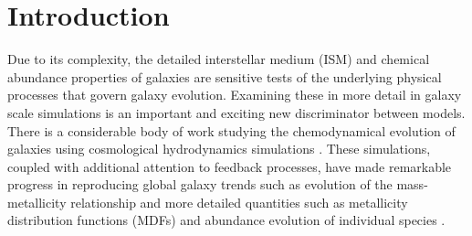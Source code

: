 \documentclass[twocolumn]{aastex61}
\begin{document}

\section{Introduction}
%
%
%

Due to its complexity, the detailed interstellar medium (ISM) and chemical abundance properties of galaxies
are sensitive tests of the underlying physical processes that govern galaxy evolution. Examining these in more detail in galaxy scale simulations is an important and exciting new discriminator between models. There is a considerable body of work studying the chemodynamical evolution of galaxies using cosmological hydrodynamics simulations \citep[e.g.][]{Lia2002,KawataGibson2003,Kobayashi2004,Tornatore2004,Romeo2005,OppenheimerDave2008,Wiersma2009,Shen2010,MUGS2010,ErisSimulation,Brook2014,Snaith2015,Oppenheimer2016,OWLS,EAGLE,FIRE}. These simulations, coupled with additional attention to feedback processes, have made remarkable progress in reproducing global galaxy trends such as evolution of the mass-metallicity relationship \citep[e.g.][]{Obreja2014, Ma2016, Dave2017, Torrey2017} and more detailed quantities such as metallicity distribution functions (MDFs) and abundance evolution of individual species \citep{Marcolini2008,Revaz2009,Sawala2010,RevazJablonka2012,Jeon2017,Hirai2017} . 
\end{document}
